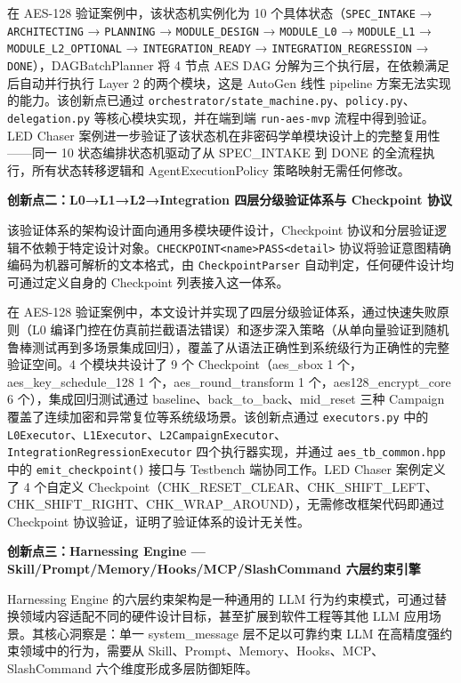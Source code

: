 在 AES-128 验证案例中，该状态机实例化为 10
个具体状态（\texttt{SPEC\_INTAKE} → \texttt{ARCHITECTING} →
\texttt{PLANNING} → \texttt{MODULE\_DESIGN} → \texttt{MODULE\_L0} →
\texttt{MODULE\_L1} → \texttt{MODULE\_L2\_OPTIONAL} →
\texttt{INTEGRATION\_READY} → \texttt{INTEGRATION\_REGRESSION} →
\texttt{DONE}），DAGBatchPlanner 将 4 节点 AES DAG
分解为三个执行层，在依赖满足后自动并行执行 Layer 2 的两个模块，这是
AutoGen 线性 pipeline 方案无法实现的能力。该创新点已通过
\texttt{orchestrator/state\_machine.py}、\texttt{policy.py}、\texttt{delegation.py}
等核心模块实现，并在端到端 \texttt{run-aes-mvp} 流程中得到验证。LED
Chaser
案例进一步验证了该状态机在非密码学单模块设计上的完整复用性------同一 10
状态编排状态机驱动了从 SPEC\_INTAKE 到 DONE
的全流程执行，所有状态转移逻辑和 AgentExecutionPolicy
策略映射无需任何修改。

\textbf{创新点二：L0→L1→L2→Integration 四层分级验证体系与 Checkpoint
协议}

该验证体系的架构设计面向通用多模块硬件设计，Checkpoint
协议和分层验证逻辑不依赖于特定设计对象。\texttt{CHECKPOINT\textbar{}\textless{}name\textgreater{}\textbar{}PASS\textbar{}\textless{}detail\textgreater{}}
协议将验证意图精确编码为机器可解析的文本格式，由
\texttt{CheckpointParser} 自动判定，任何硬件设计均可通过定义自身的
Checkpoint 列表接入这一体系。

在 AES-128
验证案例中，本文设计并实现了四层分级验证体系，通过快速失败原则（L0
编译门控在仿真前拦截语法错误）和逐步深入策略（从单向量验证到随机鲁棒测试再到多场景集成回归），覆盖了从语法正确性到系统级行为正确性的完整验证空间。4
个模块共设计了 9 个 Checkpoint（aes\_sbox 1 个，aes\_key\_schedule\_128
1 个，aes\_round\_transform 1 个，aes128\_encrypt\_core 6
个），集成回归测试通过 baseline、back\_to\_back、mid\_reset 三种
Campaign 覆盖了连续加密和异常复位等系统级场景。该创新点通过
\texttt{executors.py} 中的
\texttt{L0Executor}、\texttt{L1Executor}、\texttt{L2CampaignExecutor}、\texttt{IntegrationRegressionExecutor}
四个执行器实现，并通过 \texttt{aes\_tb\_common.hpp} 中的
\texttt{emit\_checkpoint()} 接口与 Testbench 端协同工作。LED Chaser
案例定义了 4 个自定义
Checkpoint（CHK\_RESET\_CLEAR、CHK\_SHIFT\_LEFT、CHK\_SHIFT\_RIGHT、CHK\_WRAP\_AROUND），无需修改框架代码即通过
Checkpoint 协议验证，证明了验证体系的设计无关性。

\textbf{创新点三：Harnessing Engine ---
Skill/Prompt/Memory/Hooks/MCP/SlashCommand 六层约束引擎}

Harnessing Engine 的六层约束架构是一种通用的 LLM
行为约束模式，可通过替换领域内容适配不同的硬件设计目标，甚至扩展到软件工程等其他
LLM 应用场景。其核心洞察是：单一 system\_message 层不足以可靠约束 LLM
在高精度强约束领域中的行为，需要从
Skill、Prompt、Memory、Hooks、MCP、SlashCommand
六个维度形成多层防御矩阵。

